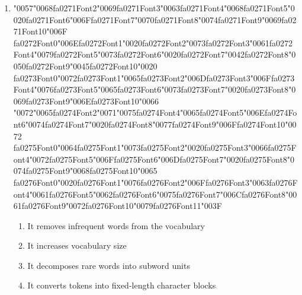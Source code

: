 \documentclass[12pt]{article}
\begin{document}
\begin{enumerate}[label=Q\arabic*.]
 \item {\char"0057}{\char"0068}{\csname fa0271Font2\endcsname\char"0069}{\csname fa0271Font3\endcsname\char"0063}{\csname fa0271Font4\endcsname\char"0068}{\csname fa0271Font5\endcsname\char"0020}{\csname fa0271Font6\endcsname\char"006F}{\csname fa0271Font7\endcsname\char"0070}{\csname fa0271Font8\endcsname\char"0074}{\csname fa0271Font9\endcsname\char"0069}{\csname fa0271Font10\endcsname\char"006F} {\csname fa0272Font0\endcsname\char"006E}{\csname fa0272Font1\endcsname\char"0020}{\csname fa0272Font2\endcsname\char"0073}{\csname fa0272Font3\endcsname\char"0061}{\csname fa0272Font4\endcsname\char"0079}{\csname fa0272Font5\endcsname\char"0073}{\csname fa0272Font6\endcsname\char"0020}{\csname fa0272Font7\endcsname\char"0042}{\csname fa0272Font8\endcsname\char"0050}{\csname fa0272Font9\endcsname\char"0045}{\csname fa0272Font10\endcsname\char"0020} {\csname fa0273Font0\endcsname\char"0072}{\csname fa0273Font1\endcsname\char"0065}{\csname fa0273Font2\endcsname\char"006D}{\csname fa0273Font3\endcsname\char"006F}{\csname fa0273Font4\endcsname\char"0076}{\csname fa0273Font5\endcsname\char"0065}{\csname fa0273Font6\endcsname\char"0073}{\csname fa0273Font7\endcsname\char"0020}{\csname fa0273Font8\endcsname\char"0069}{\csname fa0273Font9\endcsname\char"006E}{\csname fa0273Font10\endcsname\char"0066} {\char"0072}{\char"0065}{\csname fa0274Font2\endcsname\char"0071}{\char"0075}{\csname fa0274Font4\endcsname\char"0065}{\csname fa0274Font5\endcsname\char"006E}{\csname fa0274Font6\endcsname\char"0074}{\csname fa0274Font7\endcsname\char"0020}{\csname fa0274Font8\endcsname\char"0077}{\csname fa0274Font9\endcsname\char"006F}{\csname fa0274Font10\endcsname\char"0072} {\csname fa0275Font0\endcsname\char"0064}{\csname fa0275Font1\endcsname\char"0073}{\csname fa0275Font2\endcsname\char"0020}{\csname fa0275Font3\endcsname\char"0066}{\csname fa0275Font4\endcsname\char"0072}{\csname fa0275Font5\endcsname\char"006F}{\csname fa0275Font6\endcsname\char"006D}{\csname fa0275Font7\endcsname\char"0020}{\csname fa0275Font8\endcsname\char"0074}{\csname fa0275Font9\endcsname\char"0068}{\csname fa0275Font10\endcsname\char"0065} {\csname fa0276Font0\endcsname\char"0020}{\csname fa0276Font1\endcsname\char"0076}{\csname fa0276Font2\endcsname\char"006F}{\csname fa0276Font3\endcsname\char"0063}{\csname fa0276Font4\endcsname\char"0061}{\csname fa0276Font5\endcsname\char"0062}{\csname fa0276Font6\endcsname\char"0075}{\csname fa0276Font7\endcsname\char"006C}{\csname fa0276Font8\endcsname\char"0061}{\csname fa0276Font9\endcsname\char"0072}{\csname fa0276Font10\endcsname\char"0079}{\csname fa0276Font11\endcsname\char"003F}
 \begin{enumerate}[label=(\Alph*)]
     \item It removes infrequent words from the vocabulary
     \item It increases vocabulary size
     \item It decomposes rare words into subword units
     \item It converts tokens into fixed-length character blocks
 \end{enumerate}
 

\end{enumerate}
\end{document}
